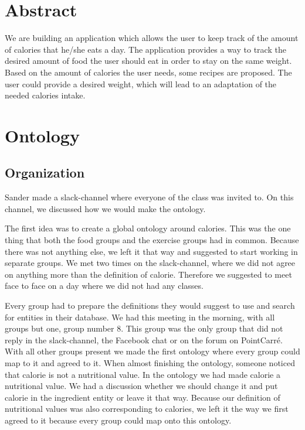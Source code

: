 






\maketitlepage

\section{Abstract}
We are building an application which allows the user to keep track of the amount of calories that he/she eats a day.  The application provides a way to track the desired amount of food the user should eat in order to stay on the same weight. Based on the amount of calories the user needs, some recipes are proposed. The user could provide a desired weight, which will lead to an adaptation of the needed calories intake.

\newpage

\section{Ontology}
\subsection{Organization}
Sander made a slack-channel where everyone of the class was invited to. On this channel, we discussed how we would make the ontology. 

The first idea was to create a global ontology around calories. This was the one thing that both the food groups and the exercise groups had in common. Because there was not anything else, we left it that way and suggested to start working in separate groups. 
We met two times on the slack-channel, where we did not agree on anything more than the definition of calorie. Therefore we suggested to meet face to face on a day where we did not had any classes. 

Every group had to prepare the definitions they would suggest to use and search for entities in their database. We had this meeting in the morning, with all groups but one, group number 8. This group was the only group that did not reply in the slack-channel, the Facebook chat or on the forum on PointCarré. With all other groups present we made the first ontology where every group could map to it and agreed to it. When almost finishing the ontology, someone noticed that calorie is not a nutritional value. In the ontology we had made calorie a nutritional value. We had a discussion whether we should change it and put calorie in the ingredient entity or leave it that way. Because our definition of nutritional values was also corresponding to calories, we left it the way we first agreed to it because every group could map onto this ontology. 

